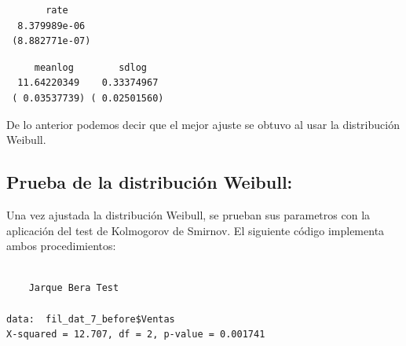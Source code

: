 \documentclass[
  us-letterpaper,
]{scrreprt}
\newenvironment{Shaded}{\begin{snugshade}}{\end{snugshade}}
\newcommand{\CommentTok}[1]{\textcolor[rgb]{0.37,0.37,0.37}{#1}}
\newcommand{\FunctionTok}[1]{\textcolor[rgb]{0.28,0.35,0.67}{#1}}
\newcommand{\NormalTok}[1]{\textcolor[rgb]{0.00,0.23,0.31}{#1}}
\newcommand{\OtherTok}[1]{\textcolor[rgb]{0.00,0.23,0.31}{#1}}
\newcommand{\SpecialCharTok}[1]{\textcolor[rgb]{0.37,0.37,0.37}{#1}}
\newcommand{\StringTok}[1]{\textcolor[rgb]{0.13,0.47,0.30}{#1}}
\theoremstyle{definition}
\theoremstyle{plain}
\theoremstyle{plain}
\theoremstyle{remark}
\begin{document}
\begin{verbatim}
       rate    
  8.379989e-06 
 (8.882771e-07)
\end{verbatim}

\begin{Shaded}
\end{Shaded}

\begin{verbatim}
     meanlog        sdlog   
  11.64220349    0.33374967 
 ( 0.03537739) ( 0.02501560)
\end{verbatim}

De lo anterior podemos decir que el mejor ajuste se obtuvo al usar la
distribución Weibull.

\subsection{Prueba de la distribución
Weibull:}\label{prueba-de-la-distribuciuxf3n-weibull}

Una vez ajustada la distribución Weibull, se prueban sus parametros con
la aplicación del test de Kolmogorov de Smirnov. El siguiente código
implementa ambos procedimientos:

\begin{Shaded}
\end{Shaded}

\begin{verbatim}

    Jarque Bera Test

data:  fil_dat_7_before$Ventas
X-squared = 12.707, df = 2, p-value = 0.001741
\end{verbatim}

\begin{Shaded}
\end{Shaded}
\end{document}
